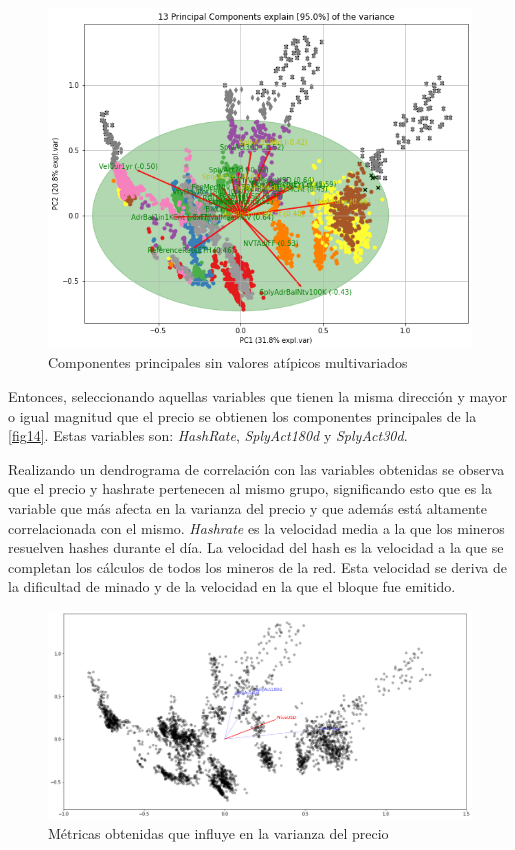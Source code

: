 \begin{figure}
	\centering
	\includegraphics[scale=0.6]{Chapter5/pca_sin_va_atipi.png}
	\caption{Componentes principales sin valores atípicos multivariados}
	\label{fig13}
\end{figure}

Entonces, seleccionando aquellas variables que tienen la misma dirección y mayor o igual magnitud que el precio se obtienen los componentes principales de la \autoref{fig14}. Estas variables son: \textit{HashRate}, \textit{SplyAct180d} y \textit{SplyAct30d}. 

Realizando un dendrograma de correlación con las variables obtenidas se observa que el precio y hashrate pertenecen al mismo grupo, significando esto que es la variable que más afecta en la varianza del precio y que además está altamente correlacionada con el mismo. \textit{Hashrate} es la velocidad media a la que los mineros resuelven hashes durante el día. La velocidad del hash es la velocidad a la que se completan los cálculos de todos los mineros de la red. Esta velocidad se deriva de la dificultad de minado y de la velocidad en la que el bloque fue emitido. 

\begin{figure}
	\centering
	\includegraphics[scale=0.4]{Chapter5/pca_price.png}
	\caption{Métricas obtenidas que influye en la varianza del precio}
	\label{fig14}
\end{figure}

